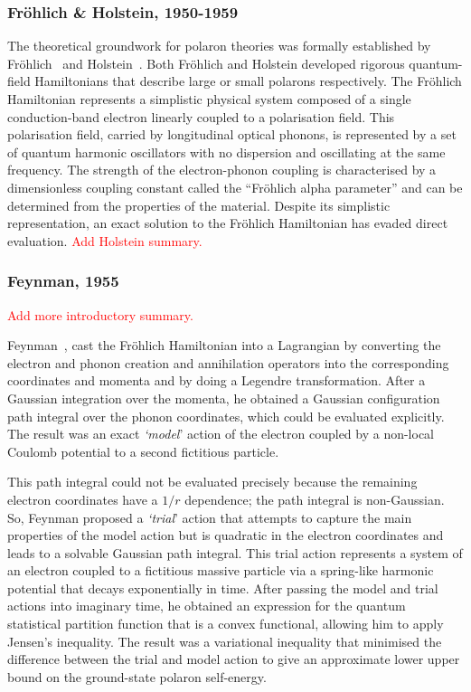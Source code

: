 \subsubsection{Fr\"ohlich \& Holstein, 1950-1959}
\label{subsubsec:2-1-1-2}

The theoretical groundwork for polaron theories was formally established by Fr\"ohlich~\cite{frohlich_electrons_1954} and Holstein~\cite{holstein_studies_1959-1, holstein_studies_1959}. Both Fr\"ohlich and Holstein developed rigorous quantum-field Hamiltonians that describe large or small polarons respectively. The Fr\"ohlich Hamiltonian represents a simplistic physical system composed of a single conduction-band electron linearly coupled to a polarisation field. This polarisation field, carried by longitudinal optical phonons, is represented by a set of quantum harmonic oscillators with no dispersion and oscillating at the same frequency. The strength of the electron-phonon coupling is characterised by a dimensionless coupling constant called the ``Fr\"ohlich alpha parameter'' and can be determined from the properties of the material. Despite its simplistic representation, an exact solution to the Fr\"ohlich Hamiltonian has evaded direct evaluation. \textcolor{red}{Add Holstein summary.}

\subsubsection{Feynman, 1955}
\label{subsubsec:2-1-1-3}

\textcolor{red}{Add more introductory summary.}

Feynman~\cite{feynman_slow_1955}, cast the Fr\"ohlich Hamiltonian into a Lagrangian by converting the electron and phonon creation and annihilation operators into the corresponding coordinates and momenta and by doing a Legendre transformation. After a Gaussian integration over the momenta, he obtained a Gaussian configuration path integral over the phonon coordinates, which could be evaluated explicitly. The result was an exact \emph{`model}' action of the electron coupled by a non-local Coulomb potential to a second fictitious particle. 

This path integral could not be evaluated precisely because the remaining electron coordinates have a $1 / r$ dependence; the path integral is non-Gaussian. So, Feynman proposed a \emph{`trial}' action that attempts to capture the main properties of the model action but is quadratic in the electron coordinates and leads to a solvable Gaussian path integral. This trial action represents a system of an electron coupled to a fictitious massive particle via a spring-like harmonic potential that decays exponentially in time. After passing the model and trial actions into imaginary time, he obtained an expression for the quantum statistical partition function that is a convex functional, allowing him to apply Jensen's inequality. The result was a variational inequality that minimised the difference between the trial and model action to give an approximate lower upper bound on the ground-state polaron self-energy.

